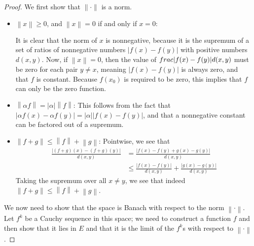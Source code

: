 \documentclass[12pt]{article}
\theoremstyle{definition}
\begin{document}
\begin{proof}
    We first show that $\lVert \cdot \rVert$ is a norm.
    \begin{itemize}
	    \item $\left \lVert { x } \right \lVert  \geq 0$, and $\left \lVert { x } \right \lVert  = 0$ if and only if $x = 0$:
		    \par It is clear that the norm of $x$ is nonnegative, because it is the supremum of a set of ratios of nonnegative numbers $\left \lvert { f(x) - f(y) } \right \lvert $ with positive numbers $d(x,y)$. Now, if $\left \lVert { x } \right \lVert  = 0$, then the value of $\\frac{\left \lvert { f(x)- f(y) } \right \lvert }{d(x,y)}$ must be zero for each pair $y\neq x$, meaning $\left \lvert { f(x) - f(y) } \right \lvert $ is always zero, and that $f$ is constant. Because $f(x_0)$ is required to be zero, this implies that $f$ can only be the zero function.
	    \item $\left \lVert { \alpha f } \right \lVert  = \left \lvert { \alpha } \right \lvert \left \lVert { f } \right \lVert $: This follows from the fact that $\left \lvert { \alpha f(x) - \alpha f(y) } \right \lvert  = \left \lvert { \alpha } \right \lvert \left \lvert { f(x) - f(y) } \right \lvert $, and that a nonnegative constant can be factored out of a supremum.
	    \item $\left \lVert { f + g } \right \lVert \leq \left \lVert { f } \right \lVert  + \left \lVert {  g } \right \lVert $: Pointwise, we see that
		    \begin{align*}
			    \frac{\left \lvert { (f+g)(x) - (f+g)(y) } \right \lvert }{d(x,y)} &= \frac{\left \lvert { f(x) - f(y) + g(x) - g(y) } \right \lvert }{d(x,y)}\\
			    &\leq \frac{\left \lvert { f(x) - f(y) } \right \lvert }{d(x,y)} + \frac{\left \lvert { g(x) - g(y) } \right \lvert }{d(x,y)}
		    \end{align*}
		    Taking the supremum over all $x \neq y$, we see that indeed $\left \lVert { f + g } \right \lVert  \leq \left \lVert { f } \right \lVert  + \left \lVert { g } \right \lVert $.
    \end{itemize}
    \par We now need to show that the space is Banach with respect to the norm $\left \lVert {  \cdot } \right \lVert $. Let $f^k$ be a Cauchy sequence in this space; we need to construct a function $f$ and then show that it lies in $E$ and that it is the limit of the $f^k$s with respect to $\left \lVert { \cdot } \right \lVert $.

\end{proof}
\end{document}
